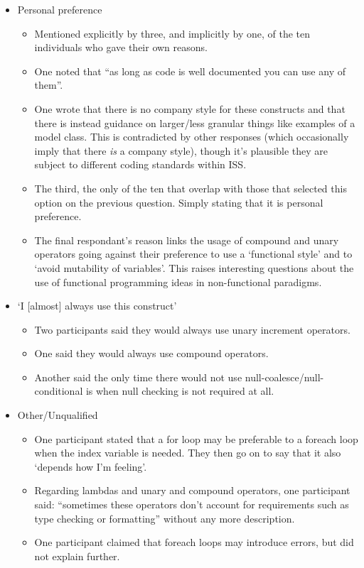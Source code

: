 \documentclass{article}
\begin{document}
            \begin{itemize}
                \item Personal preference
                \begin{itemize}
                    \item Mentioned explicitly by three, and implicitly by one, of the ten individuals who gave their own reasons.
                    \item One noted that ``as long as code is well documented you can use any of them''.
                    \item One wrote that there is no company style for these constructs and that there is instead guidance on larger/less granular things like examples of a model class. This is contradicted by other responses (which occasionally imply that there \emph{is} a company style), though it's plausible they are subject to different coding standards within ISS.
                    \item The third, the only of the ten that overlap with those that selected this option on the previous question. Simply stating that it is personal preference.
                    \item The final respondant's reason links the usage of compound and unary operators going against their preference to use a `functional style' and to `avoid mutability of variables'. This raises interesting questions about the use of functional programming ideas in non-functional paradigms.
                \end{itemize}
                \item `I [almost] always use this construct'
                \begin{itemize}
                    \item Two participants said they would always use unary increment operators.
                    \item One said they would always use compound operators.
                    \item Another said the only time there would not use null-coalesce/null-conditional is when null checking is not required at all.
                \end{itemize}
                \item Other/Unqualified
                \begin{itemize}
                    \item One participant stated that a for loop may be preferable to a foreach loop when the index variable is needed. They then go on to say that it also `depends how I'm feeling'.
                    \item Regarding lambdas and unary and compound operators, one participant said: ``sometimes these operators don't account for requirements such as type checking or formatting'' without any more description.
                    \item One participant claimed that foreach loops may introduce errors, but did not explain further.
                \end{itemize}
            \end{itemize}
\end{document}
